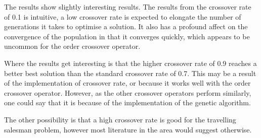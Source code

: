 \documentclass[10pt, a4paper]{article}
\begin{document}
The results show slightly interesting results. The results from the crossover
rate of 0.1 is intuitive, a low crossover rate is expected to elongate the
number of generations it takes to optimise a solution. It also has a profound
affect on the convergence of the population in that it converges quickly, which
appears to be uncommon for the order crossover operator.

Where the results get interesting is that the higher crossover rate of 0.9
reaches a better best solution than the standard crossover rate of 0.7. This 
may be a result of the implementation of crossover rate, or because it works
well with the order crossover operator. However, as the other crossover
operators perform similarly, one could say that it is because of the
implementation of the genetic algorithm.

The other possibility is that a high crossover rate is good for the travelling
salesman problem, however most literature in the area would suggest otherwise.
\end{document}
